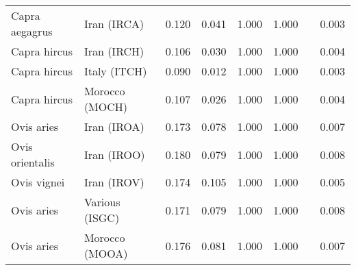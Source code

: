 \begin{center}
\begin{adjustbox}{width = 1\textwidth}
\begin{tabular}{|l|l|r|r|r|r|r|}
      Capra aegagrus &                     Iran (IRCA) &                                              0.120 &                                              0.041 &                1.000 &                                  1.000~~ &              0.003 \\
        Capra hircus &                     Iran (IRCH) &                                              0.106 &                                              0.030 &                1.000 &                                  1.000~~ &              0.004 \\
        Capra hircus &                    Italy (ITCH) &                                              0.090 &                                              0.012 &                1.000 &                                  1.000~~ &              0.003 \\
        Capra hircus &                  Morocco (MOCH) &                                              0.107 &                                              0.026 &                1.000 &                                  1.000~~ &              0.004 \\
          Ovis aries &                     Iran (IROA) &                                              0.173 &                                              0.078 &                1.000 &                                  1.000~~ &              0.007 \\
     Ovis orientalis &                     Iran (IROO) &                                              0.180 &                                              0.079 &                1.000 &                                  1.000~~ &              0.008 \\
         Ovis vignei &                     Iran (IROV) &                                              0.174 &                                              0.105 &                1.000 &                                  1.000~~ &              0.005 \\
          Ovis aries &                  Various (ISGC) &                                              0.171 &                                              0.079 &                1.000 &                                  1.000~~ &              0.008 \\
          Ovis aries &                  Morocco (MOOA) &                                              0.176 &                                              0.081 &                1.000 &                                  1.000~~ &              0.007 \\

\end{tabular}
\end{adjustbox}
\end{center}
